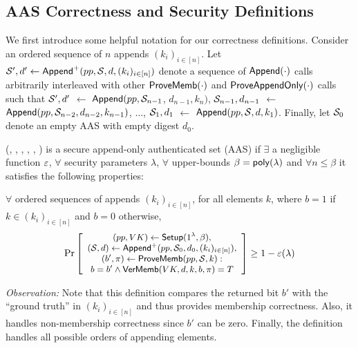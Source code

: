 \subsection{AAS Correctness and Security Definitions}
\label{s:aas:correctness-and-security}
We first introduce some helpful notation for our correctness definitions.
Consider an ordered sequence of $n$ appends $(k_i)_{i\in [n]}$.
Let 
$\mathcal{S}',d' \leftarrow \mathsf{Append}^{+}(pp, \mathcal{S}, d, (k_i)_{i\in [n]})$ 
denote a sequence of $\mathsf{Append}(\cdot)$ calls arbitrarily interleaved with other $\mathsf{ProveMemb}(\cdot)$ and $\mathsf{ProveAppendOnly}(\cdot)$ calls such that 
$\mathcal{S}',d'$ $\leftarrow$ $\mathsf{Append}(pp,\mathcal{S}_{n-1}$, $d_{n-1}, k_{n})$,
$\mathcal{S}_{n-1}, d_{n-1}$ $\leftarrow$ $\mathsf{Append}(pp,\mathcal{S}_{n-2}, d_{n-2}, k_{n-1})$,
$\dots$,
$\mathcal{S}_{1}, d_1$ $\leftarrow$ $\mathsf{Append}(pp,\mathcal{S}, d, k_{1})$.
Finally, let $\mathcal{S}_0$ denote an empty AAS with empty digest $d_0$.

\begin{definition}
    \label{d:secure-aas-definition}
    (\setup, \append, \provememb, \proveappendonly, \vermemb, \verappendonly) is a secure append-only authenticated set (AAS) if
    $\exists$ a negligible function $\varepsilon$,
    $\forall$ security parameters $\lambda$,  $\forall$ upper-bounds $\beta=\mathsf{poly}(\lambda)$ and $\forall n \le \beta$ it satisfies the following properties:
\end{definition}

\label{s:aas:membership-correctness}
$\forall$ ordered sequences of appends $(k_i)_{i\in[n]}$, for all elements $k$, where $b=1$ if $k\in (k_i)_{i\in[n]}$ and $b=0$ otherwise,
\begin{align*}
\small
\Pr \left[ \begin{array}{c}
(pp,VK) \leftarrow \setup(1^\lambda, \beta),\\
(\AS, d) \leftarrow \multiappend(pp, \AS_0, d_0, (k_i)_{i\in[n]}),\\
(b',\pi) \leftarrow \provememb(pp,\AS, k): \\
{{b=b'}\wedge{\vermemb(VK, d, k, b, \pi) = T}}
\end{array} \right]
\ge 1 - \negl(\lambda)
\end{align*}

\noindent \textit{Observation:}
Note that this definition compares the returned bit $b'$ with the ``ground truth'' in $(k_i)_{i\in[n]}$ and thus provides membership correctness.
Also, it handles non-membership correctness since $b'$ can be zero.
Finally, the definition handles all possible orders of appending elements.

